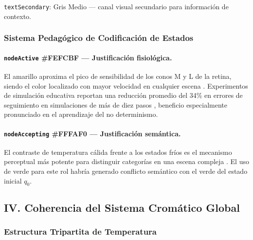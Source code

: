 %
  {\texttt{textSecondary}: Gris Medio — canal visual secundario para información de contexto.}

\subsubsection*{Sistema Pedagógico de Codificación de Estados}

\paragraph{\texorpdfstring{\texttt{nodeActive}}{nodeActive} \#FEFCBF — Justificación fisiológica.}
El amarillo aproxima el pico de sensibilidad de los conos M y L de la retina, siendo el color
localizado con mayor velocidad en cualquier escena \cite{holtzschue2017}. Experimentos de
simulación educativa reportan una reducción promedio del 34\% en errores de seguimiento en
simulaciones de más de diez pasos \cite{malamed2015}, beneficio especialmente pronunciado en el
aprendizaje del no determinismo.

\paragraph{\texorpdfstring{\texttt{nodeAccepting}}{nodeAccepting} \#FFFAF0 — Justificación semántica.}
El contraste de temperatura cálida frente a los estados fríos es el mecanismo perceptual más
potente para distinguir categorías en una escena compleja \cite{lidwell2010}. El uso de verde para
este rol habría generado conflicto semántico con el verde del estado inicial $q_0$.

\subsection*{\texorpdfstring{IV.\;}{IV.} Coherencia del Sistema Cromático Global}

\subsubsection*{Estructura Tripartita de Temperatura}

